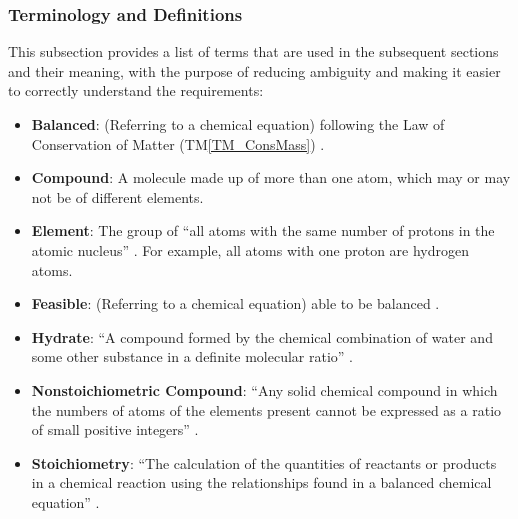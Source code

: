 \documentclass[12pt]{article}
\newcommand{\tmref}[1]{TM\ref{#1}}
\begin{document}
\subsubsection{Terminology and  Definitions} \label{sec_termsDefs}
This subsection provides a list of terms that are used in the subsequent
sections and their meaning, with the purpose of reducing ambiguity and making it
easier to correctly understand the requirements:

\begin{itemize}
  \item \textbf{Balanced}: (Referring to a chemical equation) following the Law
        of Conservation of Matter (\tmref{TM_ConsMass})
        \cite{lund_introduction_2023}.

  \item \textbf{Compound}: A molecule made up of more than one atom, which may
        or may not be of different elements.

  \item \textbf{Element}: The group of ``all atoms with the same number of
        protons in the atomic nucleus'' \cite{hartshorn_brief_2015}. For
        example, all atoms with one proton are hydrogen atoms.

  \item \textbf{Feasible}: (Referring to a chemical equation) able to be
        balanced \cite{hamid_balancing_2019}.

  \item \textbf{Hydrate}: ``A compound formed by the chemical combination of
        water and some other substance in a definite molecular ratio''
        \cite{harpercollins_publishers_hydrate_nodate}.

  \item \textbf{Nonstoichiometric Compound}: ``Any solid chemical compound in
        which the numbers of atoms of the elements present cannot be expressed
        as a ratio of small positive integers''
        \cite{the_editors_of_encyclopaedia_britannica_nonstoichiometric_2010}.


  \item \textbf{Stoichiometry}: ``The calculation of the quantities of
        reactants or products in a chemical reaction using the relationships
        found in a balanced chemical equation''
        \cite[p.~337]{lund_introduction_2023}.

\end{itemize}
\end{document}
